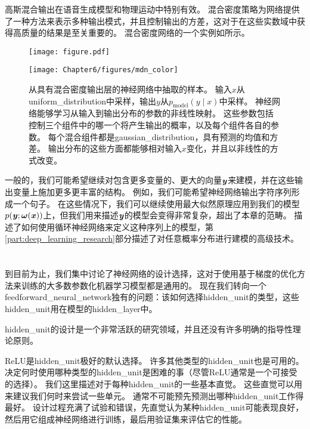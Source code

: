 
高斯混合输出在语音生成模型\citep{schuster1999supervised}和物理运动\citep{Graves-arxiv2013}中特别有效。
混合密度策略为网络提供了一种方法来表示多种输出模式，并且控制输出的方差，这对于在这些实数域中获得高质量的结果是至关重要的。
混合密度网络的一个实例如所示。
\begin{figure}[!htb]
\ifOpenSource
\centerline{\texttt{[image: figure.pdf]}}
\else
\centerline{\texttt{[image: Chapter6/figures/mdn\_color]}}
\fi
\captionsetup{singlelinecheck=off}
\caption{从具有混合密度输出层的神经网络中抽取的样本。
输入$x$从\gls{uniform_distribution}中采样，输出$y$从$p_{\text{model}}(y\mid x)$中采样。 神经网络能够学习从输入到输出分布的参数的非线性映射。 这些参数包括控制三个组件中的哪一个将产生输出的概率，以及每个组件各自的参数。
每个混合组件都是\gls{gaussian_distribution}，具有预测的均值和方差。 输出分布的这些方面都能够相对输入$x$变化，并且以非线性的方式改变。}
\label{fig:chap6_mdn_color}
\end{figure}


一般的，我们可能希望继续对包含更多变量的、更大的向量$\boldsymbol{\mathit{y}}$来建模，并在这些输出变量上施加更多更丰富的结构。
例如，我们可能希望神经网络输出字符序列形成一个句子。
在这些情况下，我们可以继续使用最大似然原理应用到我们的模型$p(\boldsymbol{\mathit{y}};\boldsymbol{\omega}(\boldsymbol{\mathit{x}}))$上，但我们用来描述$\boldsymbol{\mathit{y}}$的模型会变得非常复杂，超出了本章的范畴。
描述了如何使用循环神经网络来定义这种序列上的模型，第\ref{part:deep_learning_research}部分描述了对任意概率分布进行建模的高级技术。

\section{}
\label{sec:hidden_units}

到目前为止，我们集中讨论了神经网络的设计选择，这对于使用基于梯度的优化方法来训练的大多数参数化机器学习模型都是通用的。
现在我们转向一个\gls{feedforward_neural_network}独有的问题：该如何选择\gls{hidden_unit}的类型，这些\gls{hidden_unit}用在模型的\gls{hidden_layer}中。


\gls{hidden_unit}的设计是一个非常活跃的研究领域，并且还没有许多明确的指导性理论原则。

\gls{ReLU}是\gls{hidden_unit}极好的默认选择。
许多其他类型的\gls{hidden_unit}也是可用的。
决定何时使用哪种类型的\gls{hidden_unit}是困难的事（尽管\gls{ReLU}通常是一个可接受的选择）。
我们这里描述对于每种\gls{hidden_unit}的一些基本直觉。
这些直觉可以用来建议我们何时来尝试一些单元。
通常不可能预先预测出哪种\gls{hidden_unit}工作得最好。
设计过程充满了试验和错误，先直觉认为某种\gls{hidden_unit}可能表现良好，然后用它组成神经网络进行训练，最后用验证集来评估它的性能。

